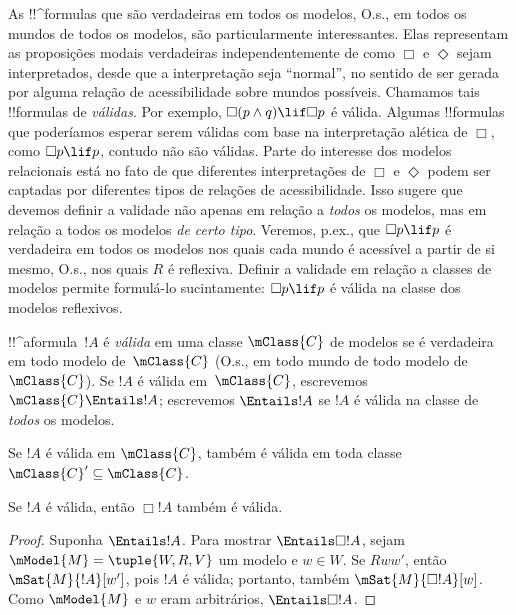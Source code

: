 \documentclass[../../../include/open-logic-section]{subfiles}
\begin{document}


\begin{explain}
  As !!^{formula}s que são verdadeiras em todos os modelos, O.s.\@, em
  todos os mundos de todos os modelos, são particularmente interessantes.
  Elas representam as proposições modais verdadeiras independentemente de
  como $\Box$ e $\Diamond$ sejam interpretados, desde que a interpretação
  seja ``normal'', no sentido de ser gerada por alguma relação de
  acessibilidade sobre mundos possíveis. Chamamos tais !!{formula}s de
  \emph{válidas}. Por exemplo, $\Box(p \land q) \lif \Box p$ é válida.
  Algumas !!{formula}s que poderíamos esperar serem válidas com base na
  interpretação alética de $\Box$, como $\Box p \lif p$, contudo não são
  válidas. Parte do interesse dos modelos relacionais está no fato de que
  diferentes interpretações de $\Box$ e $\Diamond$ podem ser captadas por
  diferentes tipos de relações de acessibilidade. Isso sugere que devemos
  definir a validade não apenas em relação a \emph{todos} os modelos, mas
  em relação a todos os modelos \emph{de certo tipo}. Veremos, p.ex.,
  que $\Box p \lif p$ é verdadeira em todos os modelos nos quais cada mundo
  é acessível a partir de si mesmo, O.s.\@, nos quais $R$ é reflexiva.
  Definir a validade em relação a classes de modelos permite formulá-lo
  sucintamente: $\Box p \lif p$ é válida na classe dos modelos reflexivos.
\end{explain}

\begin{defn}
  !!^a{formula}~$!A$ é \emph{válida} em uma classe $\mClass{C}$ de
  modelos se é verdadeira em todo modelo de~$\mClass{C}$ (O.s.\@, em
  todo mundo de todo modelo de~$\mClass{C}$). Se $!A$ é válida
  em~$\mClass{C}$, escrevemos $\mClass{C} \Entails !A$; escrevemos
  $\Entails !A$ se $!A$ é válida na classe de \emph{todos} os modelos.
\end{defn}

\begin{prop}
  Se $!A$ é válida em $\mClass{C}$, também é válida em toda classe
  $\mClass{C}' \subseteq \mClass{C}$.
\end{prop}

\begin{prop}
  Se $!A$ é válida, então $\Box!A$ também é válida. 
\end{prop}

\begin{proof}
  Suponha $\Entails !A$. Para mostrar $\Entails \Box!A$, sejam
  $\mModel{M} = \tuple{W, R, V}$ um modelo e $w \in W$. Se $Rww'$,
  então $\mSat{M}{!A}[w']$, pois $!A$ é válida; portanto, também
  $\mSat{M}{\Box!A}[w]$. Como $\mModel{M}$ e $w$ eram arbitrários,
  $\Entails \Box!A$.
\end{proof}
\end{document}
